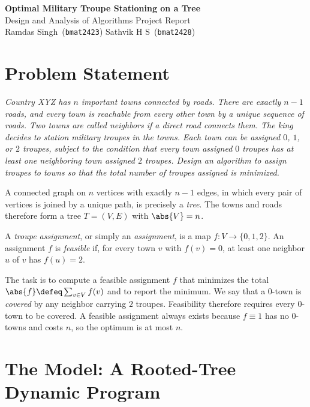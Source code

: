 \documentclass[11pt, a4paper]{article}
\newcommand{\qtext}[1]{\begingroup\itshape #1\par\endgroup\smallskip}
\theoremstyle{plain}
\theoremstyle{definition}
\begin{document}
\pagestyle{fancy}
\fancyhf{}

\begin{center}
    {\LARGE\bfseries Optimal Military Troupe Stationing on a Tree}\\[4pt]
    {\large Design and Analysis of Algorithms Project Report}\\[10pt]
    {\normalsize Ramdas Singh\ (\texttt{bmat2423}) \qquad Sathvik H S\ (\texttt{bmat2428})}
\end{center}
\vspace{1em}

\section{Problem Statement}

\qtext{Country XYZ has $n$ important towns connected by roads. There are exactly
$n-1$ roads, and every town is reachable from every other town by a unique
sequence of roads. Two towns are called neighbors if a direct road connects them.
The king decides to station military troupes in the towns. Each town can be
assigned $0$, $1$, or $2$ troupes, subject to the condition that every town
assigned $0$ troupes has at least one neighboring town assigned $2$ troupes.
Design an algorithm to assign troupes to towns so that the total number of
troupes assigned is minimized.}

\noindent A connected graph on $n$ vertices with exactly $n-1$ edges, in which
every pair of vertices is joined by a unique path, is precisely a \emph{tree}.
The towns and roads therefore form a tree $T = (V, E)$ with $\abs{V} = n$.

A \emph{troupe assignment}, or simply an \emph{assignment}, is a map
$f : V \to \{0, 1, 2\}$. An assignment $f$ is \emph{feasible} if, for every town
$v$ with $f(v) = 0$, at least one neighbor $u$ of $v$ has $f(u) = 2$.

The task is to compute a feasible assignment $f$ that minimizes the total
$\abs{f} \defeq \sum_{v \in V} f(v)$ and to report the minimum. We say that a $0$-town
is \emph{covered} by any neighbor carrying $2$ troupes. Feasibility therefore
requires every $0$-town to be covered. A feasible assignment always exists
because $f \equiv 1$ has no $0$-towns and costs $n$, so the optimum is at most
$n$.

\section{The Model: A Rooted-Tree Dynamic Program}
\end{document}
